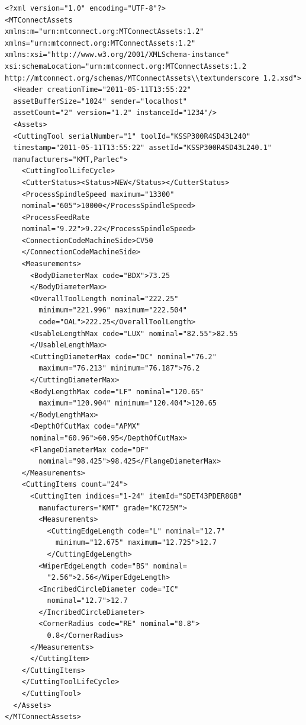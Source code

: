 \FloatBarrier


\begin{lstlisting}[firstnumber=1,escapechar=|,% 
caption={Example for Indexable Insert Measurements}, label={lst:indexable-insert-measurements}]
<?xml version="1.0" encoding="UTF-8"?>
<MTConnectAssets 
xmlns:m="urn:mtconnect.org:MTConnectAssets:1.2" 
xmlns="urn:mtconnect.org:MTConnectAssets:1.2" 
xmlns:xsi="http://www.w3.org/2001/XMLSchema-instance" 
xsi:schemaLocation="urn:mtconnect.org:MTConnectAssets:1.2
http://mtconnect.org/schemas/MTConnectAssets\\textunderscore 1.2.xsd">
  <Header creationTime="2011-05-11T13:55:22" 
  assetBufferSize="1024" sender="localhost"
  assetCount="2" version="1.2" instanceId="1234"/>
  <Assets>
  <CuttingTool serialNumber="1" toolId="KSSP300R4SD43L240" 
  timestamp="2011-05-11T13:55:22" assetId="KSSP300R4SD43L240.1" 
  manufacturers="KMT,Parlec">
    <CuttingToolLifeCycle>
    <CutterStatus><Status>NEW</Status></CutterStatus>
    <ProcessSpindleSpeed maximum="13300" 
    nominal="605">10000</ProcessSpindleSpeed>
    <ProcessFeedRate
    nominal="9.22">9.22</ProcessSpindleSpeed>
    <ConnectionCodeMachineSide>CV50
    </ConnectionCodeMachineSide>
    <Measurements>
      <BodyDiameterMax code="BDX">73.25
      </BodyDiameterMax>
      <OverallToolLength nominal="222.25" 
        minimum="221.996" maximum="222.504" 
        code="OAL">222.25</OverallToolLength>
      <UsableLengthMax code="LUX" nominal="82.55">82.55
      </UsableLengthMax>
      <CuttingDiameterMax code="DC" nominal="76.2" 
        maximum="76.213" minimum="76.187">76.2
      </CuttingDiameterMax>
      <BodyLengthMax code="LF" nominal="120.65" 
        maximum="120.904" minimum="120.404">120.65
      </BodyLengthMax>
      <DepthOfCutMax code="APMX" 
      nominal="60.96">60.95</DepthOfCutMax>
      <FlangeDiameterMax code="DF" 
        nominal="98.425">98.425</FlangeDiameterMax>
    </Measurements>
    <CuttingItems count="24">
      <CuttingItem indices="1-24" itemId="SDET43PDER8GB" 
        manufacturers="KMT" grade="KC725M">
        <Measurements>
          <CuttingEdgeLength code="L" nominal="12.7" 
            minimum="12.675" maximum="12.725">12.7
          </CuttingEdgeLength>
        <WiperEdgeLength code="BS" nominal=
          "2.56">2.56</WiperEdgeLength>
        <IncribedCircleDiameter code="IC"
          nominal="12.7">12.7
        </IncribedCircleDiameter>
        <CornerRadius code="RE" nominal="0.8">
          0.8</CornerRadius>
      </Measurements>
      </CuttingItem>
    </CuttingItems>
    </CuttingToolLifeCycle>
    </CuttingTool>
  </Assets>
</MTConnectAssets>
\end{lstlisting}

